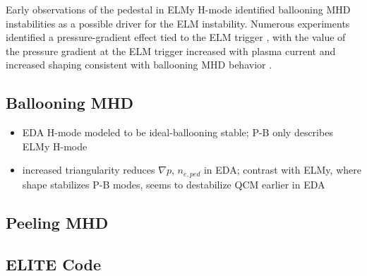 Early observations of the pedestal in ELMy H-mode identified ballooning MHD instabilities as a possible driver for the ELM instability.  Numerous experiments identified a pressure-gradient effect tied to the ELM trigger \cite{Kamada1996}, with the value of the pressure gradient at the ELM trigger increased with plasma current and increased shaping consistent with ballooning MHD behavior \cite{Suttrop2000a}.

\subsection{Ballooning MHD}\label{subsec:mod_balloon}

\begin{itemize}
 \item EDA H-mode modeled to be ideal-ballooning stable; P-B only describes ELMy H-mode \cite{Mossessian2002}
 \item increased triangularity reduces $\nabla p$, $n_{e,ped}$ in EDA; contrast with ELMy, where shape stabilizes P-B modes, seems to destabilize QCM earlier in EDA \cite{Hughes2007a}
\end{itemize}

\subsection{Peeling MHD}\label{subsec:mod_peel}

\subsection{ELITE Code}\label{subsec:mod_elite}

